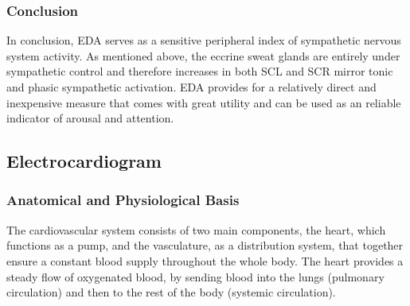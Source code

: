 \subsubsection{Conclusion}
In conclusion, EDA serves as a sensitive peripheral index of sympathetic nervous system activity. As mentioned above, the eccrine sweat glands are entirely under sympathetic control and therefore increases in both SCL and SCR mirror tonic and phasic sympathetic activation. EDA provides for a relatively direct and inexpensive measure that comes with great utility and can be used as an reliable indicator of arousal and attention.
\newpage

\subsection{Electrocardiogram}

\subsubsection{Anatomical and Physiological Basis}
The cardiovascular system consists of two main components, the heart, which functions as a pump, and the vasculature, as a distribution system, that together ensure a constant blood supply throughout the whole body. The heart provides a steady flow of oxygenated blood, by sending blood into the lungs (pulmonary circulation) and then to the rest of the body (systemic circulation).

